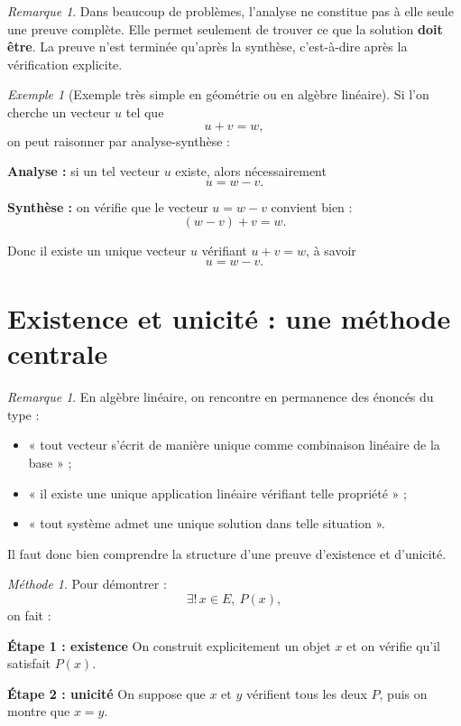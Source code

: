 \documentclass[11pt,a4paper]{article}
\theoremstyle{remark}
\newtheorem{remarque}[definition]{Remarque}
\newtheorem{exemple}[definition]{Exemple}
\newtheorem*{methode}{Méthode}
\begin{document}
\begin{remarque}
Dans beaucoup de problèmes, l’analyse ne constitue pas à elle seule une preuve complète.  
Elle permet seulement de trouver ce que la solution \textbf{doit être}. La preuve n’est terminée qu’après la synthèse, c’est-à-dire après la vérification explicite.
\end{remarque}

\begin{exemple}[Exemple très simple en géométrie ou en algèbre linéaire]
Si l’on cherche un vecteur \(u\) tel que
\[
u+v=w,
\]
on peut raisonner par analyse-synthèse :

\textbf{Analyse :} si un tel vecteur \(u\) existe, alors nécessairement
\[
u=w-v.
\]

\textbf{Synthèse :} on vérifie que le vecteur \(u=w-v\) convient bien :
\[
(w-v)+v=w.
\]

Donc il existe un unique vecteur \(u\) vérifiant \(u+v=w\), à savoir
\[
u=w-v.
\]
\end{exemple}

\section{Existence et unicité : une méthode centrale}

\begin{remarque}
En algèbre linéaire, on rencontre en permanence des énoncés du type :
\begin{itemize}
    \item « tout vecteur s’écrit de manière unique comme combinaison linéaire de la base » ;
    \item « il existe une unique application linéaire vérifiant telle propriété » ;
    \item « tout système admet une unique solution dans telle situation ».
\end{itemize}

Il faut donc bien comprendre la structure d’une preuve d’existence et d’unicité.
\end{remarque}

\begin{methode}
Pour démontrer :
\[
\exists !\,x\in E,\ P(x),
\]
on fait :

\textbf{Étape 1 : existence}  
On construit explicitement un objet \(x\) et on vérifie qu’il satisfait \(P(x)\).

\textbf{Étape 2 : unicité}  
On suppose que \(x\) et \(y\) vérifient tous les deux \(P\), puis on montre que \(x=y\).
\end{methode}
\end{document}
